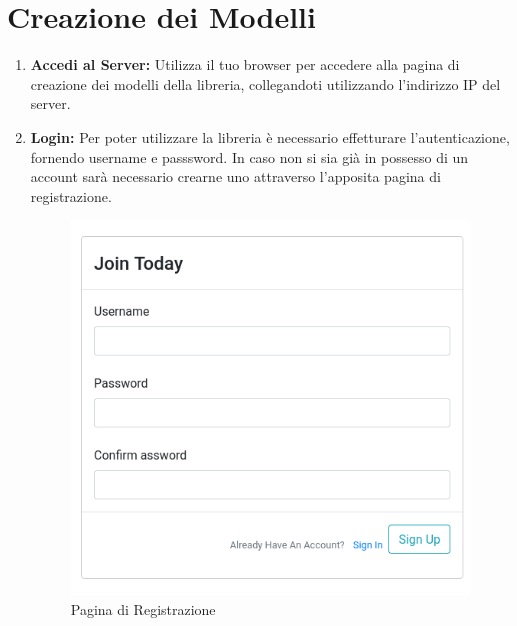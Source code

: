 \documentclass{rapportECL}
\begin{document}
\section{Creazione dei Modelli}
\begin{enumerate}
  \item \textbf{Accedi al Server:} Utilizza il tuo browser per accedere alla pagina di creazione dei modelli della libreria, 
  collegandoti utilizzando l'indirizzo IP del server.

  \item \textbf{Login:} Per poter utilizzare la libreria è necessario effetturare l'autenticazione, fornendo username e passsword. In caso non si sia già in possesso
  di un account sarà necessario crearne uno attraverso l'apposita pagina di registrazione. 

  \begin{figure}[htp]
    \begin{minipage}{0.45\textwidth}
      \includegraphics[width=\linewidth]{images/img2.png}
      \caption{Pagina di Registrazione}
  \end{minipage}\hfill
  \begin{minipage}{0.5\textwidth}

\end{minipage}
\end{figure}
\end{enumerate}
\end{document}

